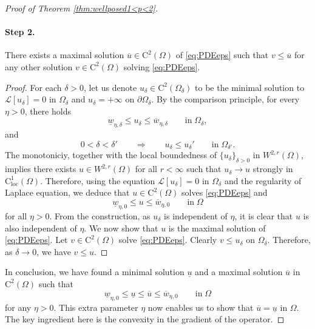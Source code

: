 \documentclass[11pt,reqno]{amsart}
\numberwithin{figure}{section}
\theoremstyle{plain}
\theoremstyle{remark}
\numberwithin{equation}{section}
\newcommand{\rmC}{\mathrm{C}}
\begin{document}
\begin{appendices}
\begin{proof} [Proof of Theorem \ref{thm:wellposed1<p<2}]
\paragraph{\textbf{Step 2.}} There exists a maximal solution $\overline{u}\in \mathrm{C}^2(\Omega)$ of \eqref{eq:PDEeps} such that $v\leq \overline{u}$ for any other solution $v\in \mathrm{C}^2(\Omega)$ solving \eqref{eq:PDEeps}.


\begin{proof} For each $\delta>0$, let us denote $u_\delta\in \mathrm{C}^2(\Omega_\delta)$ to be the minimal solution to $\mathcal{L}[u_\delta] = 0$ in $\Omega_\delta$ and $u_\delta = +\infty$ on $\partial\Omega_\delta$. By the comparison principle, for every $\eta>0$, there holds
\begin{equation*}
    \underline{w}_{\eta,\delta} \leq u_\delta \leq \overline{w}_{\eta,\delta} \qquad\text{in}\;\Omega_\delta,
\end{equation*}
and
\begin{equation*}
    0<\delta<\delta' \qquad \Longrightarrow\qquad u_\delta \leq u_\delta' \qquad\text{in}\;\Omega_{\delta'}.
\end{equation*}
The monotoniciy, together with the local boundedness of $\{u_\delta\}_{\delta>0}$ in $W^{2,r}(\Omega)$, implies there exists $u\in W^{2,r}(\Omega)$ for all $r<\infty$ such that $u_\delta\to u$ strongly in $\rmC^1_{\mathrm{loc}}(\Omega)$. Therefore, using the equation $\mathcal{L}[u_\delta] = 0$ in $\Omega_\delta$ and the regularity of Laplace equation, we deduce that $u\in \mathrm{C}^2(\Omega)$ solves \eqref{eq:PDEeps} and 
\begin{equation*}
    \underline{w}_{\eta,0} \leq u\leq \overline{w}_{\eta,0} \qquad\text{in}\;\Omega
\end{equation*}
for all $\eta>0$. From the construction, as $u_\delta$ is independent of $\eta$, it is clear that $u$ is also independent of $\eta$. We now show that $u$ is the maximal solution of \eqref{eq:PDEeps}. Let $v\in\rmC^2(\Omega)$ solve \eqref{eq:PDEeps}. Clearly $v\leq u_\delta$ on $\Omega_\delta$. Therefore, as $\delta \to 0$, we have $v\leq u$.
\end{proof}
\noindent In conclusion, we have found a minimal solution $\underline{u}$ and a maximal solution $\overline{u}$ in $\rmC^2(\Omega)$ such that
\begin{equation}\label{e:chain}
    \underline{w}_{\eta,0} \leq \underline{u}\leq \overline{u}\leq \overline{w}_{\eta,0} \qquad\text{in}\;\Omega
\end{equation}
for any $\eta>0$. This extra parameter $\eta$ now enables us to show that $\overline{u} = \underline{u}$ in $\Omega$. The key ingredient here is the convexity in the gradient of the operator.
\smallskip

\end{proof}
\end{appendices}
\end{document}
